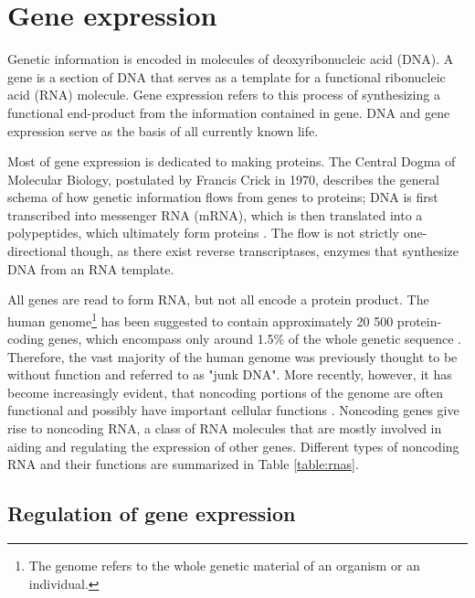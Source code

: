 
\section{Gene expression}\label{gene-expression}

Genetic information is encoded in molecules of deoxyribonucleic acid (DNA). A
gene is a section of DNA that serves as a template for a functional
ribonucleic acid (RNA) molecule. Gene expression refers to this process of
synthesizing a functional end-product from the information contained in gene.
DNA and gene expression serve as the basis of all currently known life.

Most of gene expression is dedicated to making proteins. The Central Dogma of
Molecular Biology, postulated by Francis Crick in 1970, describes the general
schema of how genetic information flows from genes to proteins; DNA is first
transcribed into messenger RNA (mRNA), which is then translated into a polypeptides,
which ultimately form proteins \citep{Crick1970}. The flow is not strictly
one-directional though, as there exist reverse transcriptases, enzymes that
synthesize DNA from an RNA template.

All genes are read to form RNA, but not all encode a protein product. The
human genome\footnote{The genome refers to the whole genetic material of an
organism or an individual.} has been suggested to contain approximately 20 500
protein-coding genes, which encompass only around 1.5\% of the whole genetic
sequence \citep{Clamp2007}. Therefore, the vast majority of the human genome
was previously thought to be without function and referred to as "junk DNA".
More recently, however, it has become increasingly evident, that noncoding
portions of the genome are often functional and possibly have important
cellular functions \citep{ENCODE}. Noncoding genes give rise to noncoding RNA,
a class of RNA molecules that are mostly involved in aiding and regulating the
expression of other genes. Different types of noncoding RNA and their
functions are summarized in Table \ref{table:rnas}.




\subsection{Regulation of gene expression}\label{regulation-of-gene-expression}

